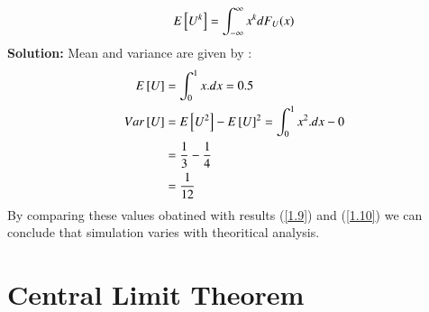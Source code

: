 \documentclass[journal,12pt,twocolumn]{IEEEtran}
\begin{document}
%
\begin{equation}
E{}\left[U^k\right] = \int_{-\infty}^{\infty}x^kdF_{U}(x)
\end{equation}
\textbf{Solution:}
Mean and variance are given by :
\begin{align}
E{}\left[U\right]&=\int_{0}^{1}x.dx=0.5\\
Var{}\left[U\right]&=E{}\left[U^2\right]-{E{}\left[U\right]}^2=\int_{0}^{1}x^2.dx - 0 \\
&=\frac{1}{3} -\frac{1}{4} \\
&=\frac{1}{12}
\end{align}
By comparing these values obatined with results (\ref{1.9}) and (\ref{1.10}) we can conclude that simulation varies with theoritical analysis.
\section{Central Limit Theorem}
%
\end{document}
